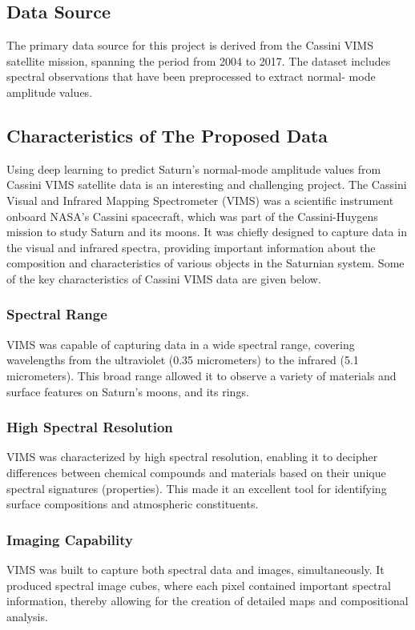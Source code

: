 \documentclass[conference]{IEEEtran}
\begin{document}
\subsection{Data Source}
The primary data source for this project is derived from the Cassini VIMS satellite mission, spanning the period
from 2004 to 2017. The dataset includes spectral observations that have been preprocessed to extract normal-
mode amplitude values.
\subsection{Characteristics of The Proposed Data} 
Using deep learning to predict Saturn's normal-mode amplitude values from Cassini VIMS satellite data is an interesting and challenging project. The Cassini Visual and Infrared Mapping Spectrometer (VIMS) was a scientific instrument onboard NASA's Cassini spacecraft, which was part of the Cassini-Huygens mission to study Saturn and its moons. It was chiefly designed to capture data in the visual and infrared spectra, providing important information about the composition and characteristics of various objects in the Saturnian system. Some of the key characteristics of Cassini VIMS data are given below.
\subsubsection{Spectral Range}
VIMS was capable of capturing data in a wide spectral range, covering wavelengths from the ultraviolet (0.35
micrometers) to the infrared (5.1 micrometers). This broad range allowed it to observe a variety of materials and
surface features on Saturn's moons, and its rings.
\subsubsection{High Spectral Resolution} 
VIMS was characterized by high spectral resolution, enabling it to decipher differences between chemical compounds and materials based on their unique spectral signatures (properties). This made it an excellent tool for identifying surface compositions and atmospheric constituents.
\subsubsection{Imaging Capability} 
VIMS was built to capture both spectral data and images, simultaneously. It produced spectral image cubes, where each pixel contained important spectral information, thereby allowing for the
creation of detailed maps and compositional analysis.
\end{document}
